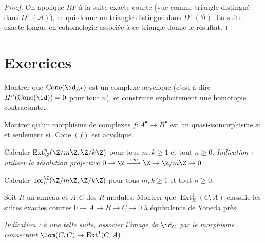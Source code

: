 \begin{proof}
On applique $RF$ à la suite exacte courte (vue comme triangle distingué
dans $D^+(\mathcal{A})$), ce qui donne un triangle distingué dans
$D^+(\mathcal{B})$. La suite exacte longue en cohomologie associée
à ce triangle donne le résultat.
\end{proof}


\section{Exercices}\label{sec:exos-derived}

\begin{exercice}\label{exo:cone-id-acyclic}
Montrer que $\operatorname{Cone}(\id_{A^\bullet})$ est un complexe acyclique
(c'est-à-dire $H^n(\operatorname{Cone}(\id)) = 0$ pour tout $n$),
et construire explicitement une homotopie contractante.
\end{exercice}

\begin{exercice}\label{exo:quasi-iso-cone}
Montrer qu'un morphisme de complexes $f \colon A^\bullet \to B^\bullet$
est un quasi-isomorphisme si et seulement si
$\operatorname{Cone}(f)$ est acyclique.
\end{exercice}

\begin{exercice}\label{exo:ext-cyclic}
Calculer $\operatorname{Ext}_\Z^n(\Z/m\Z, \Z/k\Z)$ pour tous $m, k \geq 1$
et tout $n \geq 0$.
\textit{Indication : utiliser la résolution projective
$0 \to \Z \xrightarrow{\times m} \Z \to \Z/m\Z \to 0$.}
\end{exercice}

\begin{exercice}\label{exo:tor-cyclic}
Calculer $\operatorname{Tor}_n^\Z(\Z/m\Z, \Z/k\Z)$ pour tous $m, k \geq 1$
et tout $n \geq 0$.
\end{exercice}

\begin{exercice}\label{exo:ext-ses-interpretation}
Soit $R$ un anneau et $A, C$ des $R$-modules. Montrer que
$\operatorname{Ext}_R^1(C, A)$ classifie les suites exactes courtes
$0 \to A \to B \to C \to 0$ à équivalence de Yoneda près.

\textit{Indication : à une telle suite, associer l'image de $\id_C$ par
le morphisme connectant $\Hom(C, C) \to \operatorname{Ext}^1(C, A)$.}
\end{exercice}

